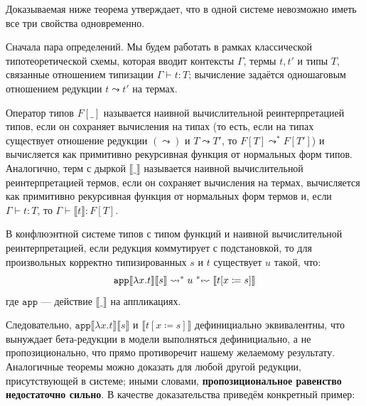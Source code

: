Доказываемая ниже теорема утверждает, что в одной
системе невозможно иметь все три свойства одновременно.

Сначала пара определений. Мы будем работать в рамках
классической типотеоретической схемы, которая вводит
контексты $\Gamma$, термы $t, t'$ и типы $T$, связанные
отношением типизации $\Gamma\vdash t:T$; вычисление
задаётся одношаговым отношением редукции $t\leadsto t'$
на термах.

\begin{definition}
    Оператор типов $F[\_]$ называется наивной
    вычислительной реинтерпретацией типов, если он
    сохраняет вычисления на типах (то есть, если на
    типах существует отношение редукции $(\leadsto)$ и
    $T\leadsto T'$, то $F[T]\leadsto^* F[T']$) и
    вычисляется как примитивно рекурсивная функция от
    нормальных форм типов. Аналогично, терм с дыркой
    $\llbracket\_\rrbracket$ называется наивной
    вычислительной реинтерпретацией термов, если он
    сохраняет вычисления на термах, вычисляется как
    примитивно рекурсивная функция от нормальных форм
    термов и, если $\Gamma\vdash t:T$, то
    $\Gamma\vdash\llbracket t\rrbracket:F[T]$.
\end{definition}

\begin{theorem}
    \label{no-go}
    В конфлюэнтной системе типов с типом функций и
    наивной вычислительной реинтерпретацией, если
    редукция коммутирует с подстановкой, то для
    произвольных корректно типизированных $s$ и $t$
    существует $u$ такой, что:
    \[
        \mathtt{app}\llbracket\lambda x.t\rrbracket
        \llbracket s \rrbracket \leadsto^* u\;
        \text{\reflectbox{$\leadsto^*$}}\;
        \llbracket t[x\coloneqq s] \rrbracket
    \]
    где $\mathtt{app}$ — действие
    $\llbracket\_\rrbracket$ на аппликациях.
\end{theorem}

Следовательно,
$\mathtt{app}\llbracket\lambda x.t\rrbracket
\llbracket s \rrbracket$ и
$\llbracket t[x\coloneqq s]\rrbracket$ дефинициально
эквивалентны, что вынуждает бета-редукции в модели
выполняться дефинициально, а не пропозиционально, что
прямо противоречит нашему желаемому результату.
Аналогичные теоремы можно доказать для любой другой
редукции, присутствующей в системе; иными словами,
\textbf{пропозициональное равенство недостаточно
сильно}. В качестве доказательства приведём конкретный
пример:

